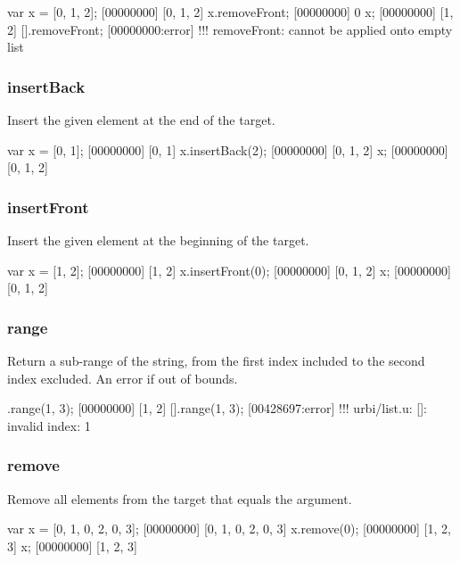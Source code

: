 \begin{urbiscript}
var x = [0, 1, 2];
[00000000] [0, 1, 2]
x.removeFront;
[00000000] 0
x;
[00000000] [1, 2]
[].removeFront;
[00000000:error] !!! removeFront: cannot be applied onto empty list
\end{urbiscript}

\subsubsection{insertBack}
\label{sec:std-list-pushback}

Insert the given element at the end of the target.

\begin{urbiscript}
var x = [0, 1];
[00000000] [0, 1]
x.insertBack(2);
[00000000] [0, 1, 2]
x;
[00000000] [0, 1, 2]
\end{urbiscript}

\subsubsection{insertFront}

Insert the given element at the beginning of the target.

\begin{urbiscript}
var x = [1, 2];
[00000000] [1, 2]
x.insertFront(0);
[00000000] [0, 1, 2]
x;
[00000000] [0, 1, 2]
\end{urbiscript}

\subsubsection{range}

Return a sub-range of the string, from the first index included to the
second index excluded. An error if out of bounds.

\begin{urbiscript}
[0, 1, 2, 3].range(1, 3);
[00000000] [1, 2]
[].range(1, 3);
[00428697:error] !!! urbi/list.u: []: invalid index: 1
\end{urbiscript}


\subsubsection{remove}

Remove all elements from the target that equals the argument.

\begin{urbiscript}
var x = [0, 1, 0, 2, 0, 3];
[00000000] [0, 1, 0, 2, 0, 3]
x.remove(0);
[00000000] [1, 2, 3]
x;
[00000000] [1, 2, 3]
\end{urbiscript}

